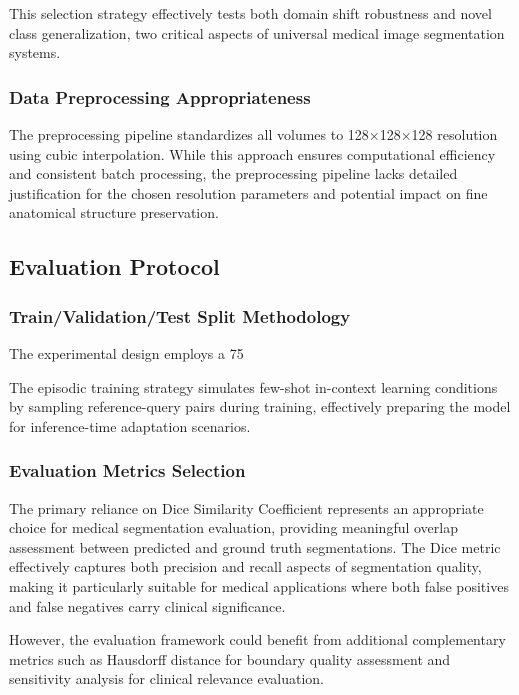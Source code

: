This selection strategy effectively tests both domain shift robustness and novel class generalization, two critical aspects of universal medical image segmentation systems.

\subsubsection{Data Preprocessing Appropriateness}
The preprocessing pipeline standardizes all volumes to 128×128×128 resolution using cubic interpolation. While this approach ensures computational efficiency and consistent batch processing, the preprocessing pipeline lacks detailed justification for the chosen resolution parameters and potential impact on fine anatomical structure preservation.

\subsection{Evaluation Protocol}
\subsubsection{Train/Validation/Test Split Methodology}
The experimental design employs a 75%

The episodic training strategy simulates few-shot in-context learning conditions by sampling reference-query pairs during training, effectively preparing the model for inference-time adaptation scenarios.

\subsubsection{Evaluation Metrics Selection}
The primary reliance on Dice Similarity Coefficient represents an appropriate choice for medical segmentation evaluation, providing meaningful overlap assessment between predicted and ground truth segmentations. The Dice metric effectively captures both precision and recall aspects of segmentation quality, making it particularly suitable for medical applications where both false positives and false negatives carry clinical significance.

However, the evaluation framework could benefit from additional complementary metrics such as Hausdorff distance for boundary quality assessment and sensitivity analysis for clinical relevance evaluation.

